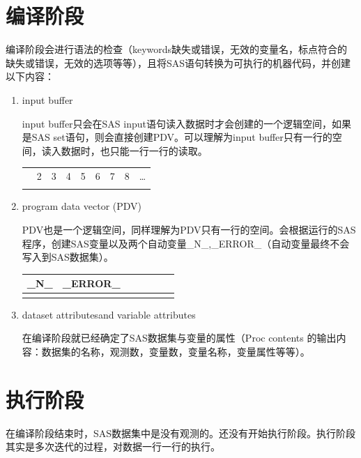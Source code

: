 \documentclass[
  letterpaper,
  DIV=11,
  numbers=noendperiod]{scrreprt}
\begin{document}
\hypertarget{ux7f16ux8bd1ux9636ux6bb5}{%
\section{编译阶段}\label{ux7f16ux8bd1ux9636ux6bb5}}

编译阶段会进行语法的检查（keywords缺失或错误，无效的变量名，标点符合的缺失或错误，无效的选项等等），且将SAS语句转换为可执行的机器代码，并创建以下内容：

\begin{enumerate}
\def\labelenumi{\arabic{enumi}.}
\item
  input buffer

  input buffer只会在SAS
  input语句读入数据时才会创建的一个逻辑空间，如果是SAS
  set语句，则会直接创建PDV。可以理解为input
  buffer只有一行的空间，读入数据时，也只能一行一行的读取。

  \begin{longtable}[]{@{}lllllllll@{}}
  \toprule\noalign{}
  \endhead
  \bottomrule\noalign{}
  \endlastfoot
  1 & 2 & 3 & 4 & 5 & 6 & 7 & 8 & \ldots{} \\
  & & & & & & & & \\
  \end{longtable}
\item
  program data vector (PDV)

  PDV也是一个逻辑空间，同样理解为PDV只有一行的空间。会根据运行的SAS程序，创建SAS变量以及两个自动变量\_N\_,\_ERROR\_（自动变量最终不会写入到SAS数据集）。

  \begin{longtable}[]{@{}lllllll@{}}
  \toprule\noalign{}
  \_N\_ & \_ERROR\_ & & & & & \\
  \midrule\noalign{}
  \endhead
  \bottomrule\noalign{}
  \endlastfoot
  & & & & & & \\
  \end{longtable}
\item
  dataset attributesand variable attributes

  在编译阶段就已经确定了SAS数据集与变量的属性（Proc contents
  的输出内容：数据集的名称，观测数，变量数，变量名称，变量属性等等）。
\end{enumerate}

\hypertarget{ux6267ux884cux9636ux6bb5}{%
\section{执行阶段}\label{ux6267ux884cux9636ux6bb5}}

在编译阶段结束时，SAS数据集中是没有观测的。还没有开始执行阶段。执行阶段其实是多次迭代的过程，对数据一行一行的执行。
\end{document}
